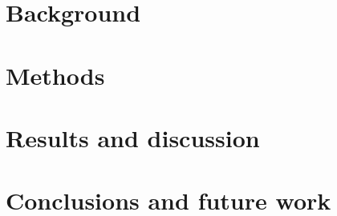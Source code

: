 \documentclass[a4paper,twocolumn,twoside]{article}
\begin{document}
	\section{Background}
	\label{Background}

	
	
	

	\section{Methods}
	\label{Methods}
	
	
	
	
	\section{Results and discussion}
	\label{Results and discussion}

	\section{Conclusions and future work}
	\label{Conclusions and future work}

	
		
	\clearpage 
\end{document}
